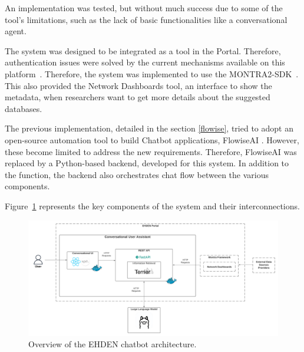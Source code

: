 An implementation was tested, but without much success due to some of the tool's limitations, such as the lack of basic functionalities like a conversational agent.

 




The system was designed to be integrated as a tool in the {\ehden} Portal. Therefore, authentication issues were solved by the current mechanisms available on this platform~\cite{almeida2024federated}. Therefore, the system was implemented to use the MONTRA2-SDK~\cite{almeida2024montra2}. This also provided the Network Dashboards tool, an interface to show the metadata, when researchers want to get more details about the suggested databases. 

The previous implementation, detailed in the section \ref{flowise}, tried to adopt an open-source automation tool to build Chatbot applications, FlowiseAI \cite{reis2024flowise}. However, these become limited to address the new requirements. Therefore, FlowiseAI was replaced by a Python-based backend, developed for this system. In addition to the {\ir} function, the backend also orchestrates chat flow between the various components.

Figure~\ref{fig_arch} represents the key components of the system and their interconnections.

\begin{figure}[H]
    \includegraphics[width=1\textwidth]{figs/chapter3/architecture.png}
    \centering
    \caption{Overview of the EHDEN chatbot architecture.}
    \label{fig_arch}
\end{figure}

